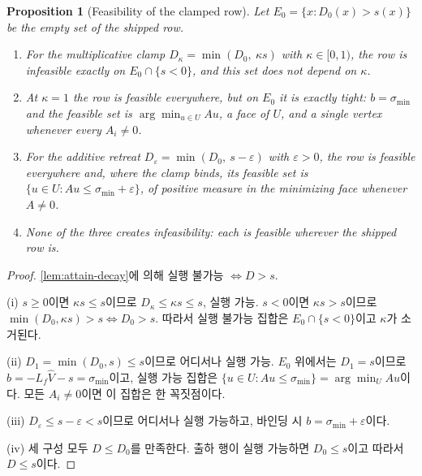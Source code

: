 \documentclass[11pt]{article}
\theoremstyle{plain}
\newtheorem{proposition}[theorem]{Proposition}
\theoremstyle{definition}
\theoremstyle{remark}
\newcommand{\Vhat}{\widehat V}
\newcommand{\Lf}{L_f}
\begin{document}
\begin{proposition}[Feasibility of the clamped row]\label{prop:clamp-feas}
Let $E_0 = \{x : D_0(x) > s(x)\}$ be the empty set of the shipped row.
\begin{enumerate}
\item[(i)] For the multiplicative clamp $D_\kappa = \min(D_0,\ \kappa s)$ with
$\kappa \in [0,1)$, the row is infeasible exactly on $E_0 \cap \{s < 0\}$, and
this set does not depend on $\kappa$.
\item[(ii)] At $\kappa = 1$ the row is feasible everywhere, but on $E_0$ it is
exactly tight: $b = \sigma_{\min}$ and the feasible set is
$\arg\min_{u \in U} Au$, a face of $U$, and a single vertex whenever every
$A_i \neq 0$.
\item[(iii)] For the additive retreat $D_\varepsilon = \min(D_0,\ s - \varepsilon)$
with $\varepsilon > 0$, the row is feasible everywhere and, where the clamp binds,
its feasible set is $\{u \in U : Au \le \sigma_{\min} + \varepsilon\}$, of positive
measure in the minimizing face whenever $A \neq 0$.
\item[(iv)] None of the three creates infeasibility: each is feasible wherever the
shipped row is.
\end{enumerate}
\end{proposition}
\begin{proof}
\cref{lem:attain-decay}에 의해 실행 불가능 $\iff D > s$.

(i) $s \ge 0$이면 $\kappa s \le s$이므로 $D_\kappa \le \kappa s \le s$, 실행 가능.
$s < 0$이면 $\kappa s > s$이므로 $\min(D_0, \kappa s) > s \iff D_0 > s$. 따라서
실행 불가능 집합은 $E_0 \cap \{s<0\}$이고 $\kappa$가 소거된다.

(ii) $D_1 = \min(D_0, s) \le s$이므로 어디서나 실행 가능. $E_0$ 위에서는
$D_1 = s$이므로 $b = -\Lf\Vhat - s = \sigma_{\min}$이고, 실행 가능 집합은
$\{u \in U: Au \le \sigma_{\min}\} = \arg\min_U Au$이다. 모든 $A_i \neq 0$이면
이 집합은 한 꼭짓점이다.

(iii) $D_\varepsilon \le s - \varepsilon < s$이므로 어디서나 실행 가능하고,
바인딩 시 $b = \sigma_{\min} + \varepsilon$이다.

(iv) 세 구성 모두 $D \le D_0$를 만족한다. 출하 행이 실행 가능하면 $D_0 \le s$이고
따라서 $D \le s$이다.
\end{proof}
\end{document}
